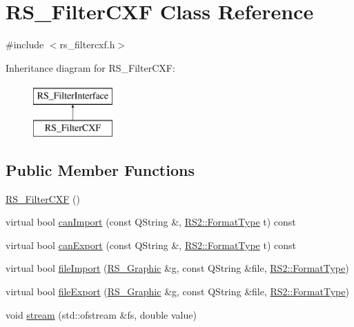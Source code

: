 \hypertarget{classRS__FilterCXF}{\section{R\-S\-\_\-\-Filter\-C\-X\-F Class Reference}
\label{classRS__FilterCXF}
}


{\ttfamily \#include $<$rs\-\_\-filtercxf.\-h$>$}

Inheritance diagram for R\-S\-\_\-\-Filter\-C\-X\-F\-:\begin{figure}[H]
\begin{center}
\leavevmode
\includegraphics[height=2.000000cm]{classRS__FilterCXF}
\end{center}
\end{figure}
\subsection*{Public Member Functions}
\begin{DoxyCompactItemize}
\item 
\hyperlink{classRS__FilterCXF_ab25b90e58b5701514899640ff5144ee7}{R\-S\-\_\-\-Filter\-C\-X\-F} ()
\item 
virtual bool \hyperlink{classRS__FilterCXF_a4ce271ce310015e83a2955733bb9c78c}{can\-Import} (const Q\-String \&, \hyperlink{classRS2_a077a6c94c9a0ab9962c4d4a612c7189b}{R\-S2\-::\-Format\-Type} t) const 
\item 
virtual bool \hyperlink{classRS__FilterCXF_af999b918b8c86033c6943086aab809ae}{can\-Export} (const Q\-String \&, \hyperlink{classRS2_a077a6c94c9a0ab9962c4d4a612c7189b}{R\-S2\-::\-Format\-Type} t) const 
\item 
virtual bool \hyperlink{classRS__FilterCXF_aa71e808f526fdfb8df9f147f642e3939}{file\-Import} (\hyperlink{classRS__Graphic}{R\-S\-\_\-\-Graphic} \&g, const Q\-String \&file, \hyperlink{classRS2_a077a6c94c9a0ab9962c4d4a612c7189b}{R\-S2\-::\-Format\-Type})
\item 
virtual bool \hyperlink{classRS__FilterCXF_aed470407f4caf1ba37b36b7a8e5b3b6c}{file\-Export} (\hyperlink{classRS__Graphic}{R\-S\-\_\-\-Graphic} \&g, const Q\-String \&file, \hyperlink{classRS2_a077a6c94c9a0ab9962c4d4a612c7189b}{R\-S2\-::\-Format\-Type})
\item 
void \hyperlink{classRS__FilterCXF_a42990bfe6c0875bf5c66b366e287ce51}{stream} (std\-::ofstream \&fs, double value)
\end{DoxyCompactItemize}
